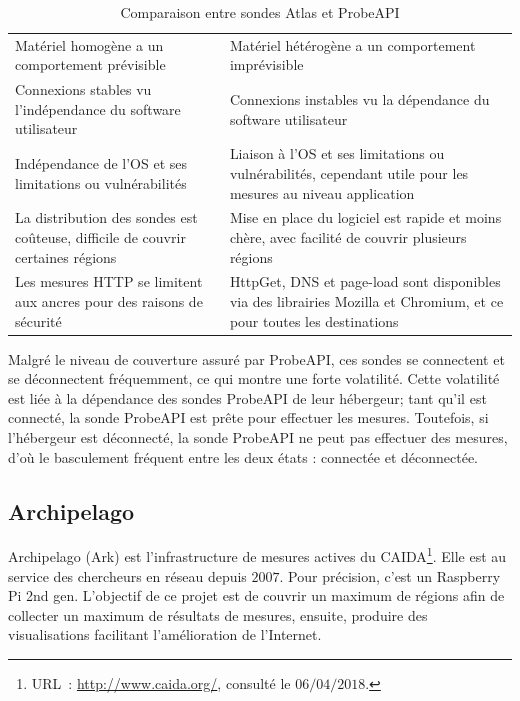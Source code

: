 \begin{table}[h]
	\centering
	\begin{adjustbox}{max width=\textwidth}
		\begin{tabularx}{\textwidth}{|X|X|}
			\hline
			\thead{Sonde Atlas}& \thead{ProbeAPI} \\ \hline
			Matériel homogène a un comportement  prévisible&  Matériel hétérogène a un  comportement imprévisible \\ \hline
			Connexions stables vu l'indépendance du software utilisateur& Connexions instables vu la dépendance du software utilisateur\\ \hline
			Indépendance  de l'OS et ses limitations ou vulnérabilités&  Liaison à l'OS et ses limitations ou vulnérabilités, cependant utile pour les mesures au niveau application \\ \hline
			La distribution des sondes est coûteuse, difficile de couvrir certaines régions&  Mise en place du logiciel est rapide et moins chère, avec facilité de couvrir plusieurs régions\\ \hline
			Les mesures HTTP se limitent aux ancres	pour des raisons de sécurité& HttpGet, DNS et page-load sont disponibles via des librairies Mozilla et Chromium, et ce pour toutes les destinations \\ \hline
		\end{tabularx}
	\end{adjustbox}
	\caption{Comparaison entre sondes  Atlas et ProbeAPI}
	\label{tab:compare-ripeatlas-probapi}
\end{table}

Malgré le niveau de couverture assuré par ProbeAPI, ces sondes se connectent et se déconnectent fréquemment, ce qui montre une forte volatilité. Cette volatilité est liée à la dépendance des sondes ProbeAPI de leur hébergeur; tant qu'il est connecté, la sonde ProbeAPI est prête pour effectuer les mesures. Toutefois, si l'hébergeur est déconnecté, la sonde ProbeAPI ne peut pas effectuer des mesures, d'où le basculement fréquent entre les deux états : connectée et déconnectée. 

\subsection{Archipelago}
Archipelago (Ark) \cite{Archipelago} est l'infrastructure de mesures actives du CAIDA\footnote{URL~: \url{http://www.caida.org/}, consulté le $ 06/04/2018$.}. Elle est au service des chercheurs en réseau depuis $2007$. Pour précision, c'est un Raspberry Pi 2nd gen. L'objectif de ce projet est de couvrir un maximum de régions afin de collecter un maximum de résultats de mesures, ensuite, produire des visualisations facilitant l'amélioration  de l'Internet. 


